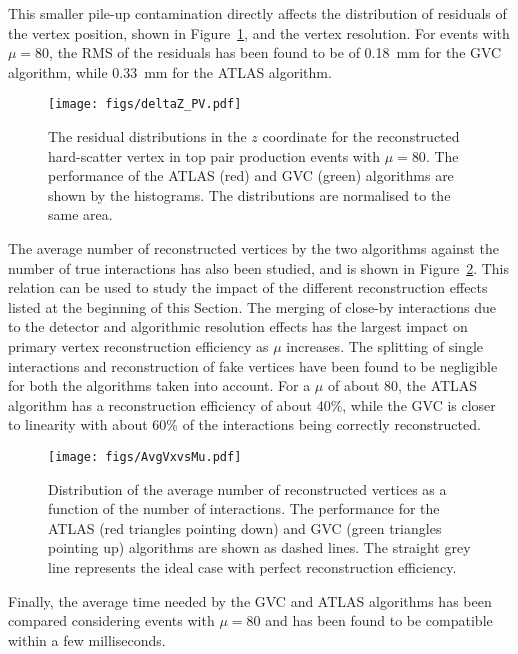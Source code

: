 \documentclass[a4paper,11pt]{article}
\begin{document}
This smaller pile-up contamination directly affects the distribution of residuals of the vertex position, shown in Figure~\ref{fig:deltaZ_PV}, and the vertex resolution. For events with $\mu=80$, the RMS of the residuals has been found to be of 0.18~mm for the GVC algorithm, while 0.33~mm for the ATLAS algorithm.

\begin{figure}[htb!]
\begin{center}
\texttt{[image: figs/deltaZ\_PV.pdf]}
\end{center}
\caption{The residual distributions in the $z$ coordinate for the reconstructed hard-scatter vertex in top pair production events with $\mu=80$. The performance of the ATLAS (red) and GVC (green) algorithms are shown by the histograms. The distributions are normalised to the same area.}
\label{fig:deltaZ_PV}
\end{figure}

The average number of reconstructed vertices by the two algorithms against the number of true interactions has also been studied, and is shown in Figure~\ref{fig:AvgVxVsMu}. This relation can be used to study the impact of the different reconstruction effects listed at the beginning of this Section. The merging of close-by interactions due to the detector and algorithmic resolution effects has the largest impact on primary vertex reconstruction efficiency as $\mu$ increases. The splitting of single interactions and reconstruction of fake vertices have been found to be negligible for both the algorithms taken into account. For a $\mu$ of about 80, the ATLAS algorithm has a reconstruction efficiency of about 40\%, while the GVC is closer to linearity with about 60\% of the interactions being correctly reconstructed. 

\begin{figure}[htb!]
\begin{center}
\texttt{[image: figs/AvgVxvsMu.pdf]}
\end{center}
\caption{Distribution of the average number of reconstructed vertices as a function of the number of interactions. The performance for the ATLAS (red triangles pointing down) and GVC (green triangles pointing up) algorithms are shown as dashed lines. The straight grey line represents the ideal case with perfect reconstruction efficiency.} 
\label{fig:AvgVxVsMu}
\end{figure}

Finally, the average time needed by the GVC and ATLAS algorithms has been compared considering events with $\mu=80$ and has been found to be compatible within a few milliseconds.
\end{document}
